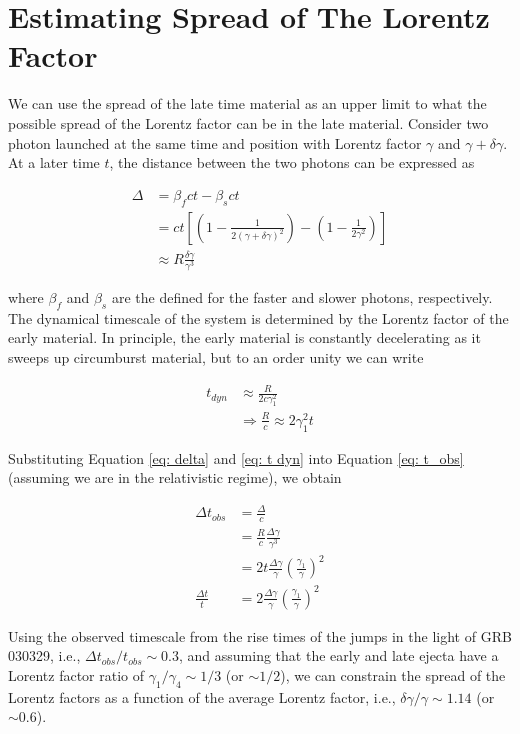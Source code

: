 \documentclass[linenumbers,twocolumn]{aastex631}
\begin{document}
\section{Estimating Spread of The Lorentz Factor}
{
    We can use the spread of the late time material as an upper limit to what the possible spread of the Lorentz factor can be in the late material. Consider two photon launched at the same time and position with Lorentz factor $\gamma$ and $\gamma+\delta \gamma$. At a later time $t$, the distance between the two photons can be expressed as

    \begin{align}
        \Delta &= \beta_f ct - \beta_s ct \\
        &= ct\left[\left(1-\frac{1}{2(\gamma+\delta \gamma)^2}\right)- \left(1 - \frac{1}{2\gamma^2}\right)\right]\\
        &\approx R \frac{\delta \gamma}{\gamma^3} \label{eq: delta}
    \end{align}

    where $\beta_f$ and $\beta_s$ are the defined for the faster and slower photons, respectively. The dynamical timescale of the system is determined by the Lorentz factor of the early material. In principle, the early material is constantly decelerating as it sweeps up circumburst material, but to an order unity we can write 

    \begin{align}
        t_{dyn} &\approx \frac{R}{2c\gamma_1^2} \\
        &\Rightarrow \frac{R}{c} \approx 2 \gamma_1^2 t \label{eq: t dyn}
    \end{align}

    Substituting Equation \ref{eq: delta} and \ref{eq: t dyn} into Equation \ref{eq: t_obs} (assuming we are in the relativistic regime), we obtain

    \begin{align}
        \Delta t_{obs} &= \frac{\Delta}{c} \\
        &= \frac{R}{c} \frac{\Delta \gamma}{\gamma^3}\\
        &= 2 t \frac{\Delta \gamma}{\gamma} \left(\frac{\gamma_1}{\gamma}\right)^2 \\
        \frac{\Delta t}{t} &= 2 \frac{\Delta \gamma}{\gamma} \left(\frac{\gamma_1}{\gamma}\right)^2
    \end{align}

    Using the observed timescale from the rise times of the jumps in the light of GRB 030329, i.e., $\Delta t_{obs}/t_{obs} \sim 0.3$, and assuming that the early and late ejecta have a Lorentz factor ratio of $\gamma_1/\gamma_4 \sim 1/3$ (or $\sim 1/2$), we can constrain the spread of the Lorentz factors as a function of the average Lorentz factor, i.e., $\delta \gamma / \gamma  \sim 1.14$ (or $\sim 0.6$).
}

    
\end{document}
